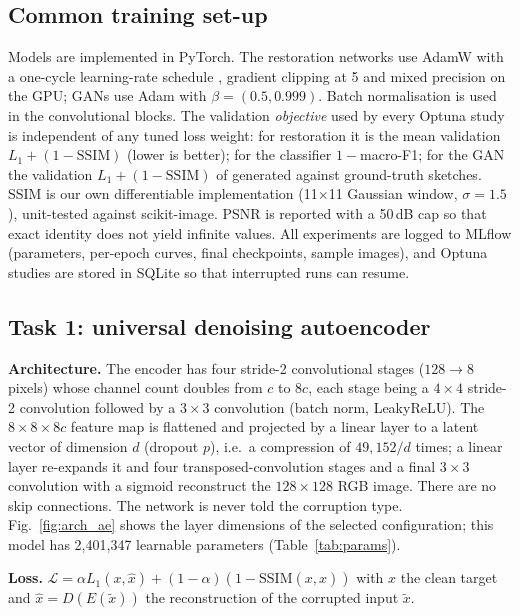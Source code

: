 \documentclass[conference]{IEEEtran}
\begin{document}
\subsection{Common training set-up}
Models are implemented in PyTorch. The restoration networks use AdamW \cite{loshchilov2019adamw} with a one-cycle learning-rate schedule \cite{smith2019onecycle}, gradient clipping at 5 and mixed precision on the GPU; GANs use Adam \cite{kingma2015adam} with $\beta=(0.5,0.999)$. Batch normalisation \cite{ioffe2015bn} is used in the convolutional blocks. The validation \emph{objective} used by every Optuna study is independent of any tuned loss weight: for restoration it is the mean validation $L_1+(1-\mathrm{SSIM})$ (lower is better); for the classifier $1-$macro-F1; for the GAN the validation $L_1+(1-\mathrm{SSIM})$ of generated against ground-truth sketches. SSIM is our own differentiable implementation (11$\times$11 Gaussian window, $\sigma=1.5$), unit-tested against scikit-image. PSNR is reported with a 50\,dB cap so that exact identity does not yield infinite values. All experiments are logged to MLflow (parameters, per-epoch curves, final checkpoints, sample images), and Optuna studies are stored in SQLite so that interrupted runs can resume.

\subsection{Task 1: universal denoising autoencoder}
\textbf{Architecture.} The encoder has four stride-2 convolutional stages ($128\to8$ pixels) whose channel count doubles from $c$ to $8c$, each stage being a $4\times4$ stride-2 convolution followed by a $3\times3$ convolution (batch norm, LeakyReLU). The $8\times8\times8c$ feature map is flattened and projected by a linear layer to a latent vector of dimension $d$ (dropout $p$), i.e.\ a compression of $49{,}152/d$ times; a linear layer re-expands it and four transposed-convolution stages and a final $3\times3$ convolution with a sigmoid reconstruct the $128\times128$ RGB image. There are no skip connections. The network is never told the corruption type. Fig.~\ref{fig:arch_ae} shows the layer dimensions of the selected configuration; this model has 2{,}401{,}347 learnable parameters (Table~\ref{tab:params}).

\textbf{Loss.} $\mathcal{L}=\alpha L_1(x,\hat{x})+(1-\alpha)(1-\mathrm{SSIM}(x,\hat{x}))$ with $x$ the clean target and $\hat{x}=D(E(\tilde{x}))$ the reconstruction of the corrupted input $\tilde{x}$.
\end{document}
